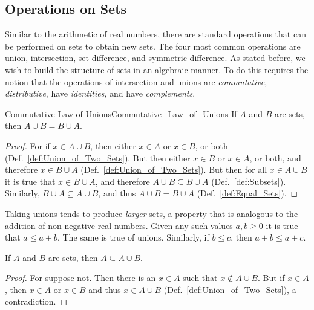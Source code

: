     \subsection{Operations on Sets}
        Similar to the arithmetic of real numbers, there are standard operations
        that can be performed on sets to obtain new sets. The four most common
        operations are union, intersection, set difference, and symmetric
        difference. As stated before, we wish to build the structure of sets in
        an algebraic manner. To do this requires the notion that the operations
        of intersection and unions are \textit{commutative},
        \textit{distributive}, have \textit{identities}, and have
        \textit{complements}.
        \begin{ltheorem}{Commutative Law of Unions}{Commutative_Law_of_Unions}
            If $A$ and $B$ are sets, then $A\cup{B}=B\cup{A}$.
        \end{ltheorem}
        \begin{proof}
            For if $x\in{A}\cup{B}$, then either $x\in{A}$ or $x\in{B}$, or both
            (Def.~\ref{def:Union_of_Two_Sets}). But then either $x\in{B}$ or
            $x\in{A}$, or both, and therefore $x\in{B}\cup{A}$
            (Def.~\ref{def:Union_of_Two_Sets}). But then for all
            $x\in{A}\cup{B}$ it is true that $x\in{B}\cup{A}$, and therefore
            $A\cup{B}\subseteq{B}\cup{A}$ (Def.~\ref{def:Subsets}). Similarly,
            $B\cup{A}\subseteq{A}\cup{B}$, and thus
            $A\cup{B}=B\cup{A}$ (Def.~\ref{def:Equal_Sets}).
        \end{proof}
        Taking unions tends to produce \textit{larger} sets, a property that is
        analogous to the addition of non-negative real numbers. Given any such
        values $a,b\geq{0}$ it is true that $a\leq{a}+b$. The same is true of
        unions. Similarly, if $b\leq{c}$, then $a+b\leq{a}+c$.
        \begin{theorem}
            \label{thm:Union_is_Bigger_Left}%
            If $A$ and $B$ are sets, then $A\subseteq{A}\cup{B}$.
        \end{theorem}
        \begin{proof}
            For suppose not. Then there is an $x\in{A}$ such that
            $x\notin{A}\cup{B}$. But if $x\in{A}$, then $x\in{A}$ or $x\in{B}$
            and thus $x\in{A}\cup{B}$ (Def.~\ref{def:Union_of_Two_Sets}), a
            contradiction.
        \end{proof}
